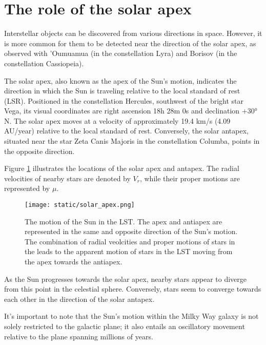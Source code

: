 \section{The role of the solar apex}


Interstellar objects can be discovered from various directions in space.
However, it is more common for them to be detected near the direction of the
solar apex, as observed with 'Oumuamua (in the constellation Lyra) and Borisov
(in the constellation Cassiopeia).

The solar apex, also known as the apex of the Sun's motion, indicates the
direction in which the Sun is traveling relative to the local standard of rest
(LSR). Positioned in the constellation Hercules, southwest of the bright star
Vega, its visual coordinates are right ascension 18h 28m 0s and declination +30°
N. The solar apex moves at a velocity of approximately 19.4 km/s (4.09 AU/year)
relative to the local standard of rest. Conversely, the solar antapex, situated
near the star Zeta Canis Majoris in the constellation Columba, points in the
opposite direction.

Figure \ref{fig:solar_apex} illustrates the locations of the solar apex and
antapex. The radial velocities of nearby stars are denoted by $V_r$, while their
proper motions are represented by $\mu$.

\begin{figure}[H]
  \centering
  \texttt{[image: static/solar\_apex.png]}
        \caption[The motion of the Sun in the LST.]
        {
          The motion of the Sun in the LST. The apex and antiapex are
          represented in the same and opposite direction of the Sun's motion.
          The combination of radial veolcities and proper motions of stars in the
          leads to the apparent motion of stars in the LST moving from the apex
          towards the antiapex.
        }
\label{fig:solar_apex}
\end{figure}

As the Sun progresses towards the solar apex, nearby stars appear to diverge
from this point in the celestial sphere. Conversely, stars seem to converge
towards each other in the direction of the solar antapex.

It's important to note that the Sun's motion within the Milky Way galaxy is not
solely restricted to the galactic plane; it also entails an oscillatory movement
relative to the plane spanning millions of years.

